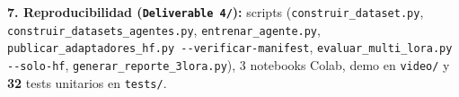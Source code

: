 \documentclass[10pt,a4paper]{article}
\newcommand{\nota}{\fontsize{6.45}{7.40}\selectfont}
\begin{document}
\vspace{1.8pt}
\colorbox{suave!60}{\parbox{\dimexpr\linewidth-2\fboxsep}{\nota\textbf{7. Reproducibilidad (\texttt{Deliverable 4/}):} scripts (\texttt{construir\_dataset.py}, \texttt{construir\_datasets\_agentes.py}, \texttt{entrenar\_agente.py}, \texttt{publicar\_adaptadores\_hf.py {-}{-}verificar-manifest}, \texttt{evaluar\_multi\_lora.py {-}{-}solo-hf}, \texttt{generar\_reporte\_3lora.py}), 3 notebooks Colab, demo en \texttt{video/} y \textbf{32} tests unitarios en \texttt{tests/}.}}
\end{document}
